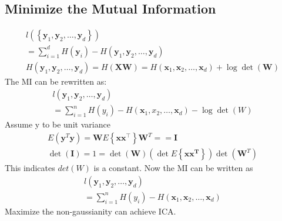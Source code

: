 \documentclass{article}
\begin{document}
\subsection{Minimize the Mutual Information}
\begin{equation}
\begin{array}{l}{l\left(\left\{\mathbf{y}_{1}, \mathbf{y}_{2}, \ldots, \mathbf{y}_{d}\right\}\right)} \\ {=\sum_{i=1}^{d} H\left(\mathbf{y}_{i}\right)-H\left(\mathbf{y}_{1}, \mathbf{y}_{2}, \ldots, \mathbf{y}_{d}\right)} \\ {H\left(\mathbf{y}_{1}, \mathbf{y}_{2}, \ldots, \mathbf{y}_{d}\right)=H(\mathbf{X} \mathbf{W})=H\left(\mathbf{x}_{1}, \mathbf{x}_{2}, \ldots, \mathbf{x}_{d}\right)+\log \operatorname{det}(\mathbf{W})}\end{array}
\end{equation}
The MI can be rewritten as:
\begin{equation}
\begin{array}{l}{l\left(\mathbf{y}_{1}, \mathbf{y}_{2}, \ldots, \mathbf{y}_{d}\right)} \\ {=\sum_{i=1}^{n} H\left(y_{i}\right)-H\left(\mathbf{x}_{1}, x_{2}, \ldots, \mathbf{x}_{d}\right)-\log \operatorname{det}(W)}\end{array}
\end{equation}
Assume y to be unit variance
\begin{equation}
\begin{array}{l}{E\left(\mathbf{y}^{T} \mathbf{y}\right)=\mathbf{W} E\left\{\mathbf{x} \mathbf{x}^{\mathbf{\top}}\right\} \mathbf{W}^{T}==\mathbf{I}} \\ {\operatorname{det}(\mathbf{I})=1=\operatorname{det}(\mathbf{W})\left(\operatorname{det} E\left\{\mathbf{x} \mathbf{x}^{\mathbf{T}}\right\}\right) \operatorname{det}\left(\mathbf{W}^{T}\right)}\end{array}
\end{equation}
This indicates $det(W)$ is a constant. Now the MI can be written as
\begin{equation}
\begin{array}{l}{l\left(\mathbf{y}_{1}, \mathbf{y}_{2}, \ldots, \mathbf{y}_{d}\right)} \\ {=\sum_{i=1}^{n} H\left(y_{i}\right)-H\left(\mathbf{x}_{1}, \mathbf{x}_{2}, \ldots, \mathbf{x}_{d}\right)}\end{array}
\end{equation}
Maximize the non-gaussianity can achieve ICA.
\end{document}
